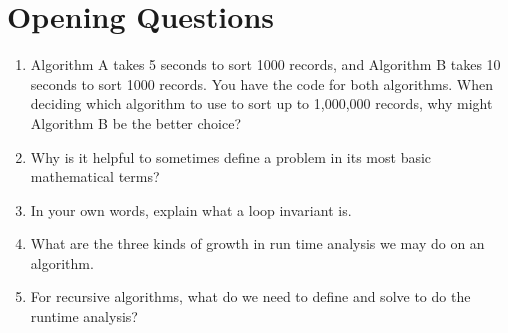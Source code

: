 \documentclass[12pt]{report}
\begin{document}
\section{Opening Questions}\label{sec:opening-questions}
\begin{enumerate}[label=\arabic*.]
	\item Algorithm A takes 5 seconds to sort 1000 records, and Algorithm B takes 10 seconds to sort 1000 records. You have the code for both algorithms. When deciding which algorithm to use to sort up to 1,000,000 records, why might Algorithm B be the better choice? 
	\item Why is it helpful to sometimes define a problem in its most basic mathematical terms? 
	\item In your own words, explain what a loop invariant is. 
	\item What are the three kinds of growth in run time analysis we may do on an algorithm. 
	\item For recursive algorithms, what do we need to define and solve to do the runtime analysis? 
\end{enumerate}
\end{document}
